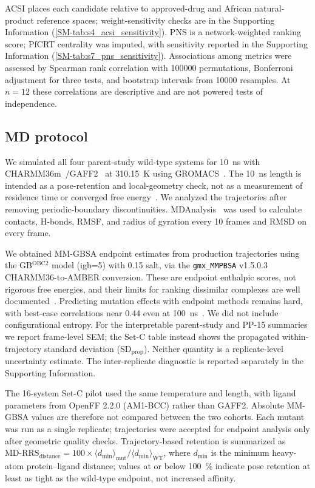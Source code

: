 \documentclass[journal=jcisd8,manuscript=article,layout=traditional]{achemso}
\begin{document}
ACSI places each candidate relative to approved-drug and African natural-product reference spaces; weight-sensitivity checks are in the Supporting Information (\cref{SM-tab:s4_acsi_sensitivity}). PNS is a network-weighted ranking score; PfCRT centrality was imputed, with sensitivity reported in the Supporting Information (\cref{SM-tab:s7_pns_sensitivity}). Associations among metrics were assessed by Spearman rank correlation with \num{100000} permutations, Bonferroni adjustment for three tests, and bootstrap intervals from \num{10000} resamples. At $n=\num{12}$ these correlations are descriptive and are not powered tests of independence.

\subsection{MD protocol}

We simulated all four parent-study wild-type systems for \qty{10}{\ns} with CHARMM36m~\citep{charmm36m_2017}/GAFF2~\citep{wang2004gaff} at \qty{310.15}{\kelvin} using GROMACS~\citep{gromacs_2015,lindahl_2024}. The \qty{10}{\ns} length is intended as a pose-retention and local-geometry check, not as a measurement of residence time or converged free energy~\citep{wei2024structure}. We analyzed the trajectories after removing periodic-boundary discontinuities. MDAnalysis~\citep{mdanalysis_2011} was used to calculate contacts, H-bonds, RMSF, and radius of gyration every \num{10} frames and RMSD on every frame.

We obtained MM-GBSA endpoint estimates from production trajectories using the GB$^{\text{OBC2}}$ model (igb=5) with \qty{0.15}{\molar} salt, via the \texttt{gmx\_MMPBSA} v1.5.0.3~\citep{gmx_mmpbsa_2021} CHARMM36-to-AMBER conversion. These are endpoint enthalpic scores, not rigorous free energies, and their limits for ranking dissimilar complexes are well documented~\citep{roux2024mmgbsa}. Predicting mutation effects with endpoint methods remains hard, with best-case correlations near 0.44 even at \qty{100}{\ns}~\citep{yu2022mutation_mmgbsa}. We did not include configurational entropy. For the interpretable parent-study and PP-15 summaries we report frame-level SEM; the Set-C table instead shows the propagated within-trajectory standard deviation (SD$_{\mathrm{prop}}$). Neither quantity is a replicate-level uncertainty estimate. The inter-replicate diagnostic is reported separately in the Supporting Information.

The 16-system Set-C pilot used the same temperature and length, with ligand parameters from OpenFF 2.2.0 (AM1-BCC) rather than GAFF2. Absolute MM-GBSA values are therefore not compared between the two cohorts. Each mutant was run as a single replicate; trajectories were accepted for endpoint analysis only after geometric quality checks. Trajectory-based retention is summarized as $\mathrm{MD\text{-}RRS}_{\mathrm{distance}} = \num{100} \times \langle d_{\min} \rangle_{\mathrm{mut}} / \langle d_{\min} \rangle_{\mathrm{WT}}$, where $d_{\min}$ is the minimum heavy-atom protein--ligand distance; values at or below \qty{100}{\percent} indicate pose retention at least as tight as the wild-type endpoint, not increased affinity.
\end{document}
